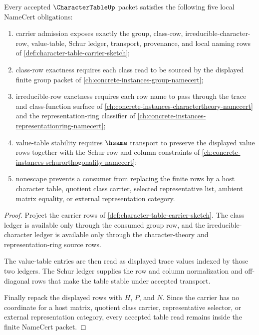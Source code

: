 \begin{theorem}
\label{thm:character-table-namecert-obligations}
Every accepted $\CharacterTableUp$ packet satisfies the following five local NameCert obligations:
\begin{enumerate}
\item carrier admission exposes exactly the group, class-row, irreducible-character-row, value-table, Schur ledger, transport, provenance, and local naming rows of \autoref{def:character-table-carrier-sketch};
\item class-row exactness requires each class read to be sourced by the displayed finite group packet of \autoref{ch:concrete-instances-group-namecert};
\item irreducible-row exactness requires each row name to pass through the trace and class-function surface of \autoref{ch:concrete-instances-charactertheory-namecert} and the representation-ring classifier of \autoref{ch:concrete-instances-representationring-namecert};
\item value-table stability requires $\hsame$ transport to preserve the displayed value rows together with the Schur row and column constraints of \autoref{ch:concrete-instances-schurorthogonality-namecert};
\item nonescape prevents a consumer from replacing the finite rows by a host character table, quotient class carrier, selected representative list, ambient matrix equality, or external representation category.
\end{enumerate}
\end{theorem}
\begin{proof}
Project the carrier rows of \autoref{def:character-table-carrier-sketch}. The class ledger is available only through the consumed group row, and the irreducible-character ledger is available only through the character-theory and representation-ring source rows.

The value-table entries are then read as displayed trace values indexed by those two ledgers. The Schur ledger supplies the row and column normalization and off-diagonal rows that make the table stable under accepted transport.

Finally repack the displayed rows with $H$, $P$, and $N$. Since the carrier has no coordinate for a host matrix, quotient class carrier, representative selector, or external representation category, every accepted table read remains inside the finite NameCert packet.
\end{proof}

